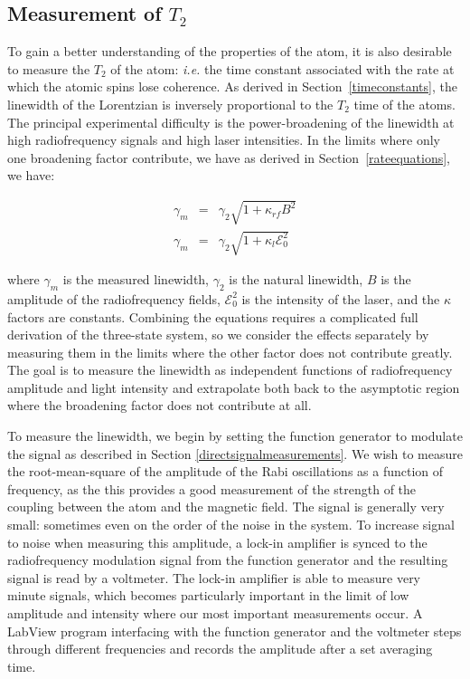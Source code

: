 \subsection{Measurement of $T_{2}$} \label{measurementoft2}

To gain a better understanding of the properties of the atom, it is also desirable to measure the $T_{2}$ of the atom: \emph{i.e.} the time constant associated with the rate at which the atomic spins lose coherence. As derived in Section~\ref{timeconstants}, the linewidth of the Lorentzian is inversely proportional to the $T_{2}$ time of the atoms. The principal experimental difficulty is the power-broadening of the linewidth at high radiofrequency signals and high laser intensities. In the limits where only one broadening factor contribute, we have as derived in Section~\ref{rateequations}, we have:

\begin{eqnarray}
\gamma_{m} &=& \gamma_{2} \sqrt{1+ \kappa_{rf} B^{2}} \label{eq:rfbroad}\\
\gamma_{m} &=&\gamma_{2} \sqrt{1+ \kappa_{l} \mathcal{E}_{0}^{2}} \label{eq:lightbroad}
\end{eqnarray}

where $\gamma_{m}$ is the measured linewidth, $\gamma_{2}$ is the natural linewidth, $B$ is the amplitude of the radiofrequency fields, $\mathcal{E}_{0}^{2}$ is the intensity of the laser, and the $\kappa$ factors are constants. Combining the equations requires a complicated full derivation of the three-state system, so we consider the effects separately by measuring them in the limits where the other factor does not contribute greatly. The goal is to measure the linewidth as independent functions of radiofrequency amplitude and light intensity and extrapolate both back to the asymptotic region where the broadening factor does not contribute at all.

To measure the linewidth, we begin by setting the function generator to modulate the signal as described in Section \ref{directsignalmeasurements}. We wish to measure the root-mean-square of the amplitude of the Rabi oscillations as a function of frequency, as the this provides a good measurement of the strength of the coupling between the atom and the magnetic field. The signal is generally very small: sometimes even on the order of the noise in the system. To increase signal to noise when measuring this amplitude, a lock-in amplifier is synced to the radiofrequency modulation signal from the function generator and the resulting signal is read by a voltmeter. The lock-in amplifier is able to measure very minute signals, which becomes particularly important in the limit of low amplitude and intensity where our most important measurements occur. A LabView program interfacing with the function generator and the voltmeter steps through different frequencies and records the amplitude after a set averaging time.


